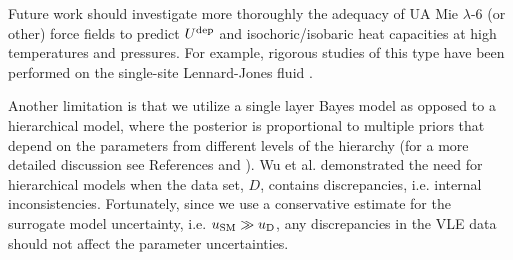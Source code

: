 \documentclass[preprint,letterpaper,floatfix,citeautoscript,aip,jcp]{revtex4-1}
\begin{document}
Future work should investigate more thoroughly the adequacy of UA Mie $\lambda$-6 (or other) force fields to predict $U^{\rm dep}$ and isochoric/isobaric heat capacities at high temperatures and pressures. For example, rigorous studies of this type have been performed on the single-site Lennard-Jones fluid \cite{Thol2016_LJ,Thol_LJTS,Rutkai2017}.  

Another limitation is that we utilize a single layer Bayes model as opposed to a hierarchical model, where the posterior is proportional to multiple priors that depend on the parameters from different levels of the hierarchy (for a more detailed discussion see References  and ). Wu et al. demonstrated the need for hierarchical models when the data set, $D$, contains discrepancies, i.e. internal inconsistencies. 
Fortunately, since we use a conservative estimate for the surrogate model uncertainty, i.e. $u_{\rm SM} \gg u_{\rm D}$, any discrepancies in the VLE data should not affect the parameter uncertainties. 
\end{document}
